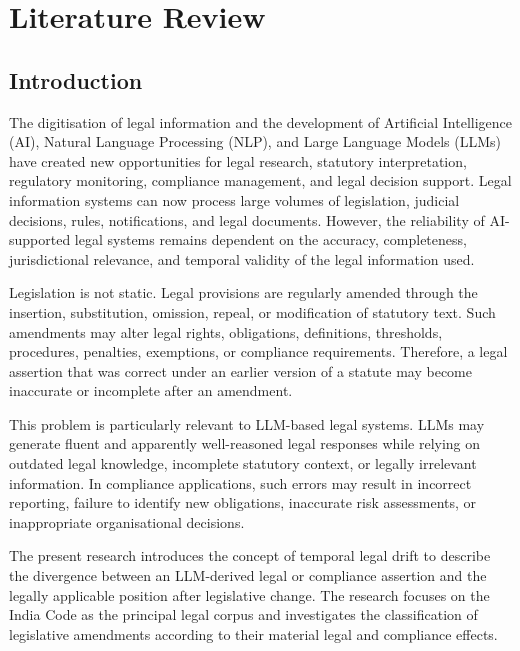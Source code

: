 \chapter{Literature Review}

\label{chap:literature-review}

\section{Introduction}

\label{sec:2-1}

The digitisation of legal information and the development of Artificial Intelligence (AI), Natural Language Processing (NLP), and Large Language Models (LLMs) have created new opportunities for legal research, statutory interpretation, regulatory monitoring, compliance management, and legal decision support. Legal information systems can now process large volumes of legislation, judicial decisions, rules, notifications, and legal documents. However, the reliability of AI-supported legal systems remains dependent on the accuracy, completeness, jurisdictional relevance, and temporal validity of the legal information used.

Legislation is not static. Legal provisions are regularly amended through the insertion, substitution, omission, repeal, or modification of statutory text. Such amendments may alter legal rights, obligations, definitions, thresholds, procedures, penalties, exemptions, or compliance requirements. Therefore, a legal assertion that was correct under an earlier version of a statute may become inaccurate or incomplete after an amendment.

This problem is particularly relevant to LLM-based legal systems. LLMs may generate fluent and apparently well-reasoned legal responses while relying on outdated legal knowledge, incomplete statutory context, or legally irrelevant information. In compliance applications, such errors may result in incorrect reporting, failure to identify new obligations, inaccurate risk assessments, or inappropriate organisational decisions.

The present research introduces the concept of temporal legal drift to describe the divergence between an LLM-derived legal or compliance assertion and the legally applicable position after legislative change. The research focuses on the India Code as the principal legal corpus and investigates the classification of legislative amendments according to their material legal and compliance effects.

